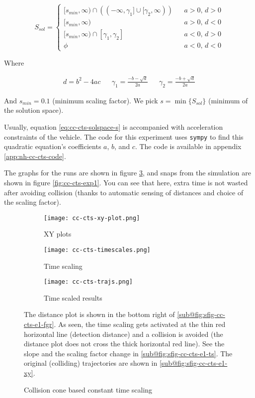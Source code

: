\begin{equation}
    S_{sol} = \left\{\begin{matrix}
        [s_{min}, \infty) \cap \left ( (-\infty, \gamma_1] \cup [\gamma_2, \infty) \right ) && a > 0,\, d > 0 \\
        [s_{min}, \infty) && a > 0,\, d < 0 \\
        [s_{min}, \infty) \cap [\gamma_1, \gamma_2] && a < 0 ,\, d > 0 \\
        \phi && a < 0 ,\, d < 0
    \end{matrix}\right.
    \label{eq:cc-cts-solspace-s}
\end{equation}

Where

\begin{align*}
    d = b^2 - 4ac
    &&
    \gamma_1 = \frac{-b - \sqrt{d}}{2a}
    &&
    \gamma_2 = \frac{-b + \sqrt{d}}{2a}
\end{align*}

And $s_{min} = 0.1$ (minimum scaling factor). We pick $s = \min\{S_{sol}\}$ (minimum of the solution space).

Usually, equation \ref{eq:cc-cts-solspace-s} is accompanied with acceleration constraints of the vehicle. The code for this experiment uses \texttt{sympy} to find this quadratic equation's coefficients $a$, $b$, and $c$. The code is available in appendix \ref{app:nh-cc-cts-code}.

The graphs for the runs are shown in figure \ref{fig:cc-cts-exp1-graphs}, and snaps from the simulation are shown in figure \ref{fig:cc-cts-exp1}. You can see that here, extra time is not wasted after avoiding collision (thanks to automatic sensing of distances and choice of the scaling factor).

\begin{figure}
    \centering
    \begin{subfigure}[b]{0.49\textwidth}
        \texttt{[image: cc-cts-xy-plot.png]}
        \caption{XY plots}
        \label{fig:sfig-cc-cts-e1-xy}
        \texttt{[image: cc-cts-timescales.png]}
        \caption{Time scaling}
        \label{fig:sfig-cc-cts-e1-ts}
    \end{subfigure}
    \begin{subfigure}[b]{0.49\textwidth}
        \texttt{[image: cc-cts-trajs.png]}
        \caption{Time scaled results}
        \label{fig:sfig-cc-cts-e1-fgr}
    \end{subfigure}
    \caption{Collision cone based constant time scaling}
    \label{fig:cc-cts-exp1-graphs}
    \small
        The distance plot is shown in the bottom right of \ref{sub@fig:sfig-cc-cts-e1-fgr}. As seen, the time scaling gets activated at the thin red horizontal line (detection distance) and a collision is avoided (the distance plot does not cross the thick horizontal red line). See the slope and the scaling factor change in \ref{sub@fig:sfig-cc-cts-e1-ts}. The original (colliding) trajectories are shown in \ref{sub@fig:sfig-cc-cts-e1-xy}.
\end{figure}

